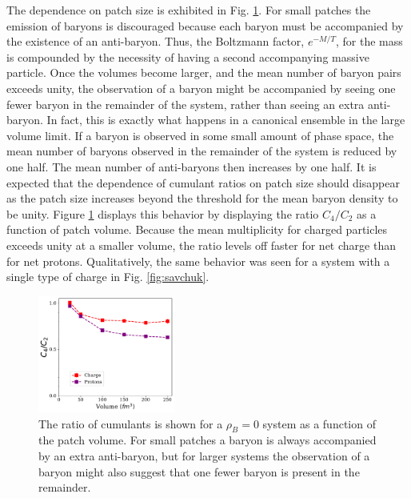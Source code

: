 The dependence on patch size is exhibited in Fig. \ref{fig:uniform_vs_volume}. For small patches the emission of baryons is discouraged because each baryon must be accompanied by the existence of an anti-baryon. Thus, the Boltzmann factor, $e^{-M/T}$, for the mass is compounded by the necessity of having a second accompanying massive particle. Once the volumes become larger, and the mean number of baryon pairs exceeds unity, the observation of a baryon might be accompanied by seeing one fewer baryon in the remainder of the system, rather than seeing an extra anti-baryon. In fact, this is exactly what happens in a canonical ensemble in the large volume limit. If a baryon is observed in some small amount of phase space, the mean number of baryons observed in the remainder of the system is reduced by one half. The mean number of anti-baryons then increases by one half. It is expected that the dependence of cumulant ratios on patch size should disappear as the patch size increases beyond the threshold for the mean baryon density to be unity. Figure \ref{fig:uniform_vs_volume} displays this behavior by displaying the ratio $C_4/C_2$ as a function of patch volume. Because the mean multiplicity for charged particles exceeds unity at a smaller volume, the ratio levels off faster for net charge than for net protons. Qualitatively, the same behavior was seen for a system with a single type of charge in Fig. \ref{fig:savchuk}.
\begin{figure}
\centerline{\includegraphics[width=0.4\textwidth]{figs/m_vs_volume}}
\caption{\label{fig:uniform_vs_volume}
The ratio of cumulants is shown for a $\rho_B=0$ system as a function of the patch volume. For small patches a baryon is always accompanied by an extra anti-baryon, but for larger systems the observation of a baryon might also suggest that one fewer baryon is present in the remainder.}
\end{figure}

